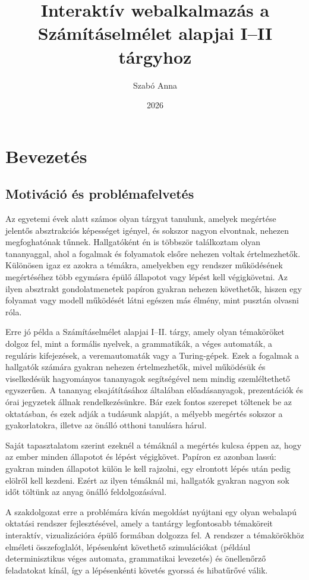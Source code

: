 \documentclass[12pt,a4paper]{report}
\title{Interaktív webalkalmazás a Számításelmélet alapjai I–II tárgyhoz}
\author{Szabó Anna}
\date{2026}
\begin{document}
\maketitle

\tableofcontents

\part{Bevezetés}

\chapter{Motiváció és problémafelvetés}

Az egyetemi évek alatt számos olyan tárgyat tanulunk, amelyek megértése
jelentős absztrakciós képességet igényel, és sokszor nagyon elvontnak,
nehezen megfoghatónak tűnnek. Hallgatóként én is többször találkoztam olyan
tananyaggal, ahol a fogalmak és folyamatok elsőre nehezen voltak értelmezhetők.
Különösen igaz ez azokra a témákra, amelyekben egy rendszer működésének megértéséhez
több egymásra épülő állapotot vagy lépést kell végigkövetni.
Az ilyen absztrakt gondolatmenetek papíron gyakran nehezen követhetők,
hiszen egy folyamat vagy modell működését látni egészen más élmény,
mint pusztán olvasni róla.

Erre jó példa a Számításelmélet alapjai I--II. tárgy,
amely olyan témaköröket dolgoz fel, mint a formális nyelvek,
a grammatikák, a véges automaták, a reguláris kifejezések,
a veremautomaták vagy a Turing-gépek.
Ezek a fogalmak a hallgatók számára gyakran nehezen értelmezhetők, mivel
működésük és viselkedésük hagyományos tananyagok segítségével nem mindig
szemléltethető egyszerűen.
A tananyag elsajátításához általában előadásanyagok, prezentációk és
órai jegyzetek állnak rendelkezésünkre. Bár ezek fontos szerepet
töltenek be az oktatásban, és ezek adják a tudásunk alapját, a
mélyebb megértés sokszor a gyakorlatokra, illetve az önálló otthoni
tanulásra hárul.

Saját tapasztalatom szerint ezeknél a témáknál a megértés kulcsa
éppen az, hogy az ember minden állapotot és lépést végigkövet. Papíron
ez azonban lassú: gyakran minden állapotot külön le kell rajzolni, egy
elrontott lépés után pedig elölről kell kezdeni. Ezért az ilyen
témáknál mi, hallgatók gyakran nagyon sok időt töltünk az anyag önálló
feldolgozásával.

A szakdolgozat erre a problémára kíván megoldást nyújtani egy olyan
webalapú oktatási rendszer fejlesztésével, amely a tantárgy
legfontosabb témaköreit interaktív, vizualizációra épülő formában
dolgozza fel. A rendszer a témakörökhöz elméleti összefoglalót,
lépésenként követhető szimulációkat (például determinisztikus véges
automata, grammatikai levezetés) és önellenőrző feladatokat kínál,
így a lépésenkénti követés gyorssá és hibatűrővé válik.
\end{document}
